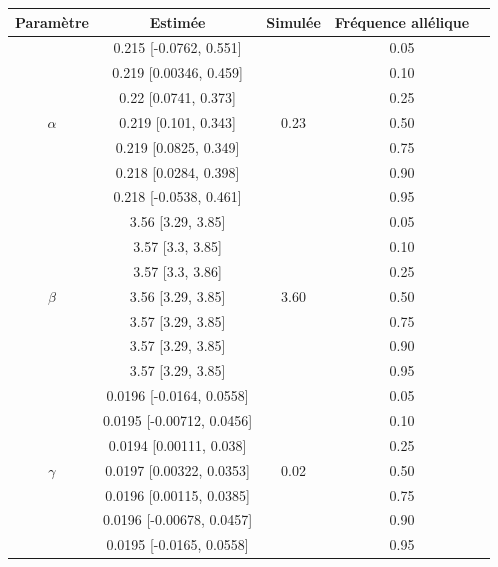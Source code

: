 \documentclass[11pt, a4paper]{article}
\begin{document}
\begin{table}[!h]
    \begin{center}
        \begin{tabular}{ccccc}
            \hline
            Paramètre & Estimée & Simulée & Fréquence allélique\\
            \hline
            \multirow{7}{*}{$\alpha$} & 0.215 [-0.0762, 0.551] & \multirow{7}{*}{0.23} & 0.05 \\
             & 0.219 [0.00346, 0.459] &  & 0.10 \\
             & 0.22 [0.0741, 0.373] &  & 0.25 \\
             & 0.219 [0.101, 0.343] &  & 0.50 \\
             & 0.219 [0.0825, 0.349] &  & 0.75 \\
             & 0.218 [0.0284, 0.398] &  & 0.90 \\
             & 0.218 [-0.0538, 0.461] &  & 0.95 \\
            \hline
            \multirow{7}{*}{$\beta$} & 3.56 [3.29, 3.85] & \multirow{7}{*}{3.60} & 0.05 \\
             & 3.57 [3.3, 3.85] &  & 0.10 \\
             & 3.57 [3.3, 3.86] &  & 0.25 \\
             & 3.56 [3.29, 3.85] &  & 0.50 \\
             & 3.57 [3.29, 3.85] &  & 0.75 \\
             & 3.57 [3.29, 3.85] &  & 0.90 \\
             & 3.57 [3.29, 3.85] &  & 0.95 \\
            \hline
            \multirow{7}{*}{$\gamma$} & 0.0196 [-0.0164, 0.0558] & \multirow{7}{*}{0.02} & 0.05 \\
             & 0.0195 [-0.00712, 0.0456] &  & 0.10 \\
             & 0.0194 [0.00111, 0.038] &  & 0.25 \\
             & 0.0197 [0.00322, 0.0353] &  & 0.50 \\
             & 0.0196 [0.00115, 0.0385] &  & 0.75 \\
             & 0.0196 [-0.00678, 0.0457] &  & 0.90 \\
             & 0.0195 [-0.0165, 0.0558] &  & 0.95 \\
            \hline
        \end{tabular}
        \label{tab:Scenario1}
    \end{center}
\end{table}
\end{document}
